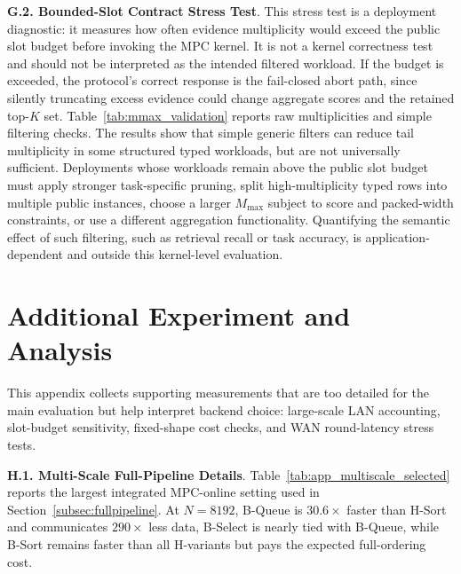 \documentclass[conference,compsoc,letterpaper]{IEEEtran}
\theoremstyle{definition}
\theoremstyle{remark}
\newcommand{\myparagraph}[1]{\noindent \textbf{#1}.}
\newcommand{\Mmax}{M_{\max}}
\newcommand{\HSort}{H-Sort}
\newcommand{\BSort}{B-Sort}
\newcommand{\BQueue}{B-Queue}
\newcommand{\BSelect}{B-Select}
\begin{document}
\myparagraph{G.2. Bounded-Slot Contract Stress Test}
\label{app:mmax_validation}
This stress test is a deployment diagnostic: it measures how often evidence multiplicity would exceed the public slot budget before invoking the MPC kernel.
It is not a kernel correctness test and should not be interpreted as the intended filtered workload.
If the budget is exceeded, the protocol's correct response is the fail-closed abort path, since silently truncating excess evidence could change aggregate scores and the retained top-\(K\) set.
Table~\ref{tab:mmax_validation} reports raw multiplicities and simple filtering checks.
The results show that simple generic filters can reduce tail multiplicity in some structured typed workloads, but are not universally sufficient.
Deployments whose workloads remain above the public slot budget must apply stronger task-specific pruning, split high-multiplicity typed rows into multiple public instances, choose a larger \(\Mmax\) subject to score and packed-width constraints, or use a different aggregation functionality.
Quantifying the semantic effect of such filtering, such as retrieval recall or task accuracy, is application-dependent and outside this kernel-level evaluation.

\section{Additional Experiment and Analysis}
\vspace{-2mm}
\label{app:additional_experiments}

This appendix collects supporting measurements that are too detailed for the main evaluation but help interpret backend choice: large-scale LAN accounting, slot-budget sensitivity, fixed-shape cost checks, and WAN round-latency stress tests.

\myparagraph{H.1. Multi-Scale Full-Pipeline Details}
\label{app:multiscale}
Table~\ref{tab:app_multiscale_selected} reports the largest integrated MPC-online setting used in Section~\ref{subsec:fullpipeline}.
At \(N=8192\), \BQueue{} is \(30.6\times\) faster than \HSort{} and communicates \(290\times\) less data, \BSelect{} is nearly tied with \BQueue{}, while \BSort{} remains faster than all H-variants but pays the expected full-ordering cost.
\end{document}

